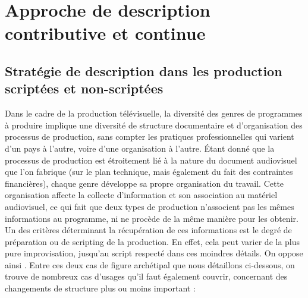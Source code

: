 







\section{Approche de description contributive et continue}\label{sec:approche}


\subsection{Stratégie de description dans les production scriptées et non-scriptées}
Dans le cadre de la production télévisuelle, la diversité des genres de programmes à produire implique une diversité de structure documentaire et d'organisation des processus de production, sans compter les pratiques professionnelles qui varient d'un pays à l'autre, voire d'une organisation à l'autre. 
Étant donné que la processus de production est étroitement lié à la nature du document audiovisuel que l'on fabrique (sur le plan technique, mais également du fait des contraintes financières), chaque genre développe sa propre organisation du travail.
Cette organisation affecte la collecte d'information et son association au matériel audiovisuel, ce qui fait que deux types de production n'associent pas les mêmes informations au programme, ni ne procède de la même manière pour les obtenir.
Un des critères déterminant la récupération de ces informations est le degré de préparation ou de scripting de la production.
En effet, cela peut varier de la plus pure improvisation, jusqu'au script respecté dans ces moindres détails. On oppose ainsi .
Entre ces deux cas de figure archétipal que nous détaillons ci-dessous, on trouve de nombreux cas d'usages qu'il faut également couvrir, concernant des changements de structure plus ou moins important : 

